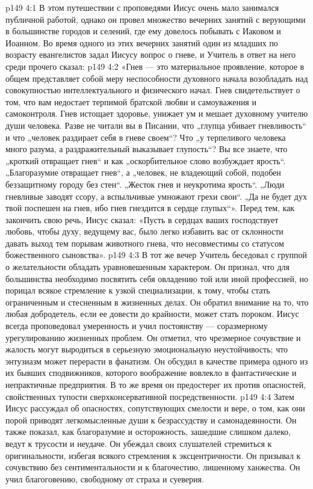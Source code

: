 \vs p149 4:1 В этом путешествии с проповедями Иисус очень мало занимался публичной работой, однако он провел множество вечерних занятий с верующими в большинстве городов и селений, где ему довелось побывать с Иаковом и Иоанном. Во время одного из этих вечерних занятий один из младших по возрасту евангелистов задал Иисусу вопрос о гневе, и Учитель в ответ на него среди прочего сказал:
\vs p149 4:2 \pc «Гнев --- это материальное проявление, которое в общем представляет собой меру неспособности духовного начала возобладать над совокупностью интеллектуального и физического начал. Гнев свидетельствует о том, что вам недостает терпимой братской любви и самоуважения и самоконтроля. Гнев истощает здоровье, унижает ум и мешает духовному учителю души человека. Разве не читали вы в Писании, что „глупца убивает гневливость“ и что „человек раздирает себя в гневе своем“? Что „у терпеливого человека много разума, а раздражительный выказывает глупость“? Вы все знаете, что „кроткий отвращает гнев“ и как „оскорбительное слово возбуждает ярость“. „Благоразумие отвращает гнев“, а „человек, не владеющий собой, подобен беззащитному городу без стен“. „Жесток гнев и неукротима ярость“. „Люди гневливые заводят ссору, а вспыльчивые умножают грехи свои“. „Да не будет дух твой поспешен на гнев, ибо гнев гнездится в сердце глупых“». Перед тем, как закончить свою речь, Иисус сказал: «Пусть в сердцах ваших господствует любовь, чтобы духу, ведущему вас, было легко избавить вас от склонности давать выход тем порывам животного гнева, что несовместимы со статусом божественного сыновства».
\vs p149 4:3 \pc В тот же вечер Учитель беседовал с группой о желательности обладать уравновешенным характером. Он признал, что для большинства необходимо посвятить себя овладению той или иной профессией, но порицал всякое стремление к узкой специализации, к тому, чтобы стать ограниченным и стесненным в жизненных делах. Он обратил внимание на то, что любая добродетель, если ее довести до крайности, может стать пороком. Иисус всегда проповедовал умеренность и учил постоянству --- соразмерному урегулированию жизненных проблем. Он отметил, что чрезмерное сочувствие и жалость могут выродиться в серьезную эмоциональную неустойчивость; что энтузиазм может перерасти в фанатизм. Он обсудил в качестве примера одного из их бывших сподвижников, которого воображение вовлекло в фантастические и непрактичные предприятия. В то же время он предостерег их против опасностей, свойственных тупости сверхконсервативной посредственности.
\vs p149 4:4 Затем Иисус рассуждал об опасностях, сопутствующих смелости и вере, о том, как они порой приводят легкомысленные души к безрассудству и самонадеянности. Он также показал, как благоразумие и осторожность, зашедшие слишком далеко, ведут к трусости и неудаче. Он убеждал своих слушателей стремиться к оригинальности, избегая всякого стремления к эксцентричности. Он призывал к сочувствию без сентиментальности и к благочестию, лишенному ханжества. Он учил благоговению, свободному от страха и суеверия.
